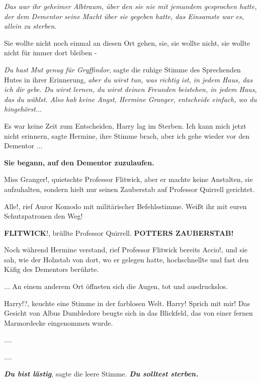 \emph{Das war ihr geheimer Albtraum, über den sie nie mit jemandem gesprochen
hatte, der dem Dementor seine Macht über sie gegeben hatte, das Einsamste war
es, allein zu sterben.}

Sie wollte nicht noch einmal an diesen Ort gehen, sie, sie wollte nicht, sie
wollte nicht für immer dort bleiben -

\emph{Du hast Mut genug für Gryffindor}, sagte die ruhige Stimme des Sprechenden
Hutes in ihrer Erinnerung, \emph{aber du wirst tun, was richtig ist, in jedem
Haus, das ich dir gebe. Du wirst lernen, du wirst deinen Freunden beistehen, in
jedem Haus, das du wählst. Also hab keine Angst, Hermine Granger, entscheide
einfach, wo du hingehörst.}..

Es war keine Zeit zum Entscheiden, Harry lag im Sterben. \glqq{}Ich kann mich
jetzt nicht erinnern\grqq{}, sagte Hermine, ihre Stimme brach, \glqq{}aber ich
gehe wieder vor den Dementor ...\grqq{}

\textbf{ Sie begann, auf den Dementor zuzulaufen.}

\glqq{}Miss Granger!\grqq{}, quietschte Professor Flitwick, aber er machte keine
Anstalten, sie aufzuhalten, sondern hielt nur seinen Zauberstab auf Professor
Quirrell gerichtet.

\glqq{}Alle!\grqq{}, rief Auror Komodo mit militärischer Befehlsstimme. \glqq{}
Weißt ihr mit euren Schutzpatronen den Weg!\grqq{}

\glqq{}\textbf{FLITWICK}!\grqq{}, brüllte Professor Quirrell. \glqq{}
\textbf{POTTERS ZAUBERSTAB!}\grqq{}

Noch während Hermine verstand, rief Professor Flitwick bereits \glqq{}
Accio!\grqq{}, und sie sah, wie der Holzstab von dort, wo er gelegen hatte,
hochschnellte und fast den Käfig des Dementors berührte.

... An einem anderem Ort öffneten sich die Augen, tot und ausdruckslos.

\glqq{}Harry!?\grqq{}, keuchte eine Stimme in der farblosen Welt. \glqq{}Harry!
Sprich mit mir!\grqq{} Das Gesicht von Albus Dumbledore beugte sich in das Blickfeld,
das von einer fernen Marmordecke eingenommen wurde.

....

....

\textbf{\emph{Du bist lästig}}\grqq{}, sagte die leere Stimme.
\glqq{}\textbf{\emph{Du solltest sterben.}}

